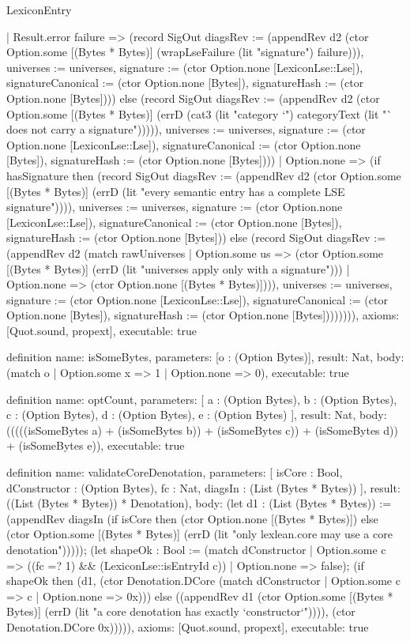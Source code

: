\begin{lexlean}{LexiconEntry}
\begin{semanticmodule}
{      | Result.error failure => (record SigOut {diagsRev := (appendRev d2 (ctor Option.some [(Bytes * Bytes)] (wrapLseFailure (lit "signature") failure))), universes := universes, signature := (ctor Option.none [LexiconLse::Lse]), signatureCanonical := (ctor Option.none [Bytes]), signatureHash := (ctor Option.none [Bytes])})) else (record SigOut {diagsRev := (appendRev d2 (ctor Option.some [(Bytes * Bytes)] (errD (cat3 (lit "category `") categoryText (lit "` does not carry a signature"))))), universes := universes, signature := (ctor Option.none [LexiconLse::Lse]), signatureCanonical := (ctor Option.none [Bytes]), signatureHash := (ctor Option.none [Bytes])}))
    | Option.none => (if hasSignature then (record SigOut {diagsRev := (appendRev d2 (ctor Option.some [(Bytes * Bytes)] (errD (lit "every semantic entry has a complete LSE signature")))), universes := universes, signature := (ctor Option.none [LexiconLse::Lse]), signatureCanonical := (ctor Option.none [Bytes]), signatureHash := (ctor Option.none [Bytes])}) else (record SigOut {diagsRev := (appendRev d2 (match rawUniverses
      | Option.some us => (ctor Option.some [(Bytes * Bytes)] (errD (lit "universes apply only with a signature")))
      | Option.none => (ctor Option.none [(Bytes * Bytes)]))), universes := universes, signature := (ctor Option.none [LexiconLse::Lse]), signatureCanonical := (ctor Option.none [Bytes]), signatureHash := (ctor Option.none [Bytes])})))))),
  axioms: [Quot.sound, propext],
  executable: true
}

definition{
  name: isSomeBytes,
  parameters: [o : (Option Bytes)],
  result: Nat,
  body: (match o | Option.some x => 1 | Option.none => 0),
  executable: true
}

definition{
  name: optCount,
  parameters: [
    a : (Option Bytes),
    b : (Option Bytes),
    c : (Option Bytes),
    d : (Option Bytes),
    e : (Option Bytes)
  ],
  result: Nat,
  body: (((((isSomeBytes a) + (isSomeBytes b)) + (isSomeBytes c)) + (isSomeBytes d)) + (isSomeBytes e)),
  executable: true
}

definition{
  name: validateCoreDenotation,
  parameters: [
    isCore : Bool,
    dConstructor : (Option Bytes),
    fc : Nat,
    diagsIn : (List (Bytes * Bytes))
  ],
  result: ((List (Bytes * Bytes)) * Denotation),
  body: (let d1 : (List (Bytes * Bytes)) := (appendRev diagsIn (if isCore then (ctor Option.none [(Bytes * Bytes)]) else (ctor Option.some [(Bytes * Bytes)] (errD (lit "only lexlean.core may use a core denotation"))))); (let shapeOk : Bool := (match dConstructor
    | Option.some c => ((fc =? 1) && (LexiconLse::isEntryId c))
    | Option.none => false); (if shapeOk then (d1, (ctor Denotation.DCore (match dConstructor
    | Option.some c => c
    | Option.none => 0x))) else ((appendRev d1 (ctor Option.some [(Bytes * Bytes)] (errD (lit "a core denotation has exactly `constructor`")))), (ctor Denotation.DCore 0x))))),
  axioms: [Quot.sound, propext],
  executable: true
}


\end{semanticmodule}
\end{lexlean}
